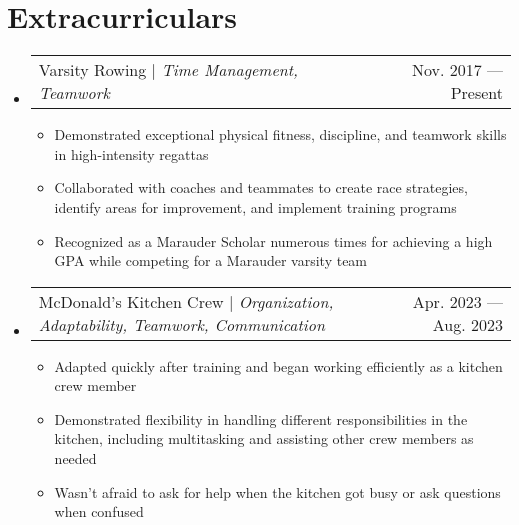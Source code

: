 \documentclass[letterpaper,11pt]{article}
\makeatletter
\newcommand{\resumeItem}[1]{
	\item\small{
		{#1 \vspace{-2pt}}
	}
}
\newcommand{\resumeProjectHeading}[2]{
	\item
	\begin{tabular*}{0.97\textwidth}{l@{\extracolsep{\fill}}r}
		\small#1 & #2 \\
	\end{tabular*}\vspace{-7pt}
}
\newcommand{\resumeSubHeadingListStart}{\begin{itemize}[leftmargin=0.15in,
			label={}]}
\newcommand{\resumeSubHeadingListEnd}{\end{itemize}}
\newcommand{\resumeItemListStart}{\begin{itemize}}
\newcommand{\resumeItemListEnd}{\end{itemize}\vspace{-5pt}}
\makeatother
\begin{document}
\section{Extracurriculars}
\resumeSubHeadingListStart
\resumeProjectHeading{Varsity Rowing $|$ \emph{Time Management, Teamwork}}{Nov. 2017 ---
	Present}
\resumeItemListStart
\resumeItem{Demonstrated exceptional physical fitness, discipline, and teamwork skills in high-intensity regattas}
\resumeItem{Collaborated with coaches and teammates to create race strategies, identify areas for improvement, and implement training programs}
\resumeItem{Recognized as a Marauder Scholar numerous times for achieving a high GPA while competing for a Marauder varsity team}
\resumeItemListEnd
\resumeProjectHeading{McDonald's Kitchen Crew $|$ \emph{Organization, Adaptability, Teamwork, Communication}}{Apr. 2023 --- Aug. 2023}
\resumeItemListStart
\resumeItem{Adapted quickly after training and began working efficiently as a kitchen crew member}
\resumeItem{Demonstrated flexibility in handling different responsibilities in the kitchen, including multitasking and assisting other crew members as needed}
\resumeItem{Wasn't afraid to ask for help when the kitchen got busy or ask questions when confused}
\resumeItemListEnd
\resumeSubHeadingListEnd

\end{document}
